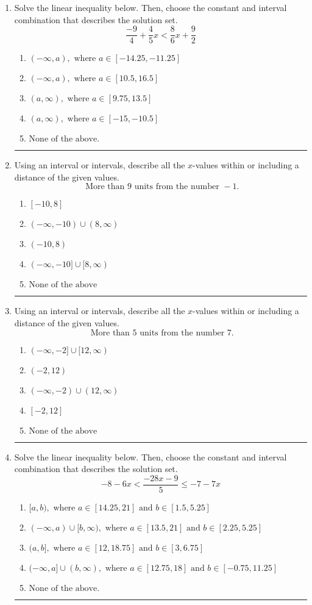 \documentclass[14pt]{extbook}
\newcommand{\litem}[1]{\item#1\hspace*{-1cm}\rule{\textwidth}{0.4pt}}
\begin{document}
\begin{enumerate}
{\begin{enumerate}[label=\Alph*.]
\end{enumerate} }
\litem{
Solve the linear inequality below. Then, choose the constant and interval combination that describes the solution set.\[ \frac{-9}{4} + \frac{4}{5} x < \frac{8}{6} x + \frac{9}{2} \]\begin{enumerate}[label=\Alph*.]
\item \( (-\infty, a), \text{ where } a \in [-14.25, -11.25] \)
\item \( (-\infty, a), \text{ where } a \in [10.5, 16.5] \)
\item \( (a, \infty), \text{ where } a \in [9.75, 13.5] \)
\item \( (a, \infty), \text{ where } a \in [-15, -10.5] \)
\item \( \text{None of the above}. \)

\end{enumerate} }
\litem{
Using an interval or intervals, describe all the $x$-values within or including a distance of the given values.\[ \text{ More than } 9 \text{ units from the number } -1. \]\begin{enumerate}[label=\Alph*.]
\item \( [-10, 8] \)
\item \( (-\infty, -10) \cup (8, \infty) \)
\item \( (-10, 8) \)
\item \( (-\infty, -10] \cup [8, \infty) \)
\item \( \text{None of the above} \)

\end{enumerate} }
\litem{
Using an interval or intervals, describe all the $x$-values within or including a distance of the given values.\[ \text{ More than } 5 \text{ units from the number } 7. \]\begin{enumerate}[label=\Alph*.]
\item \( (-\infty, -2] \cup [12, \infty) \)
\item \( (-2, 12) \)
\item \( (-\infty, -2) \cup (12, \infty) \)
\item \( [-2, 12] \)
\item \( \text{None of the above} \)

\end{enumerate} }
\litem{
Solve the linear inequality below. Then, choose the constant and interval combination that describes the solution set.\[ -8 - 6 x < \frac{-28 x - 9}{5} \leq -7 - 7 x \]\begin{enumerate}[label=\Alph*.]
\item \( [a, b), \text{ where } a \in [14.25, 21] \text{ and } b \in [1.5, 5.25] \)
\item \( (-\infty, a) \cup [b, \infty), \text{ where } a \in [13.5, 21] \text{ and } b \in [2.25, 5.25] \)
\item \( (a, b], \text{ where } a \in [12, 18.75] \text{ and } b \in [3, 6.75] \)
\item \( (-\infty, a] \cup (b, \infty), \text{ where } a \in [12.75, 18] \text{ and } b \in [-0.75, 11.25] \)
\item \( \text{None of the above.} \)


\end{enumerate}}
\end{enumerate}
\end{document}
